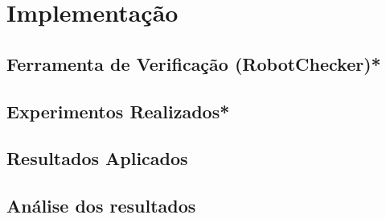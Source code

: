 \chapter{Implementação}

\section{Ferramenta de Verificação (RobotChecker)*}

\section{Experimentos Realizados*}

\section{Resultados Aplicados}

\section{Análise dos resultados}

